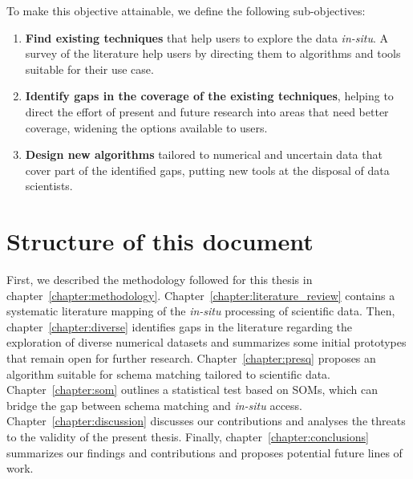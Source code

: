 To make this objective attainable, we define the following sub-objectives:

\begin{enumerate}
    \item \textbf{Find existing techniques} that help users
        to  explore the data \emph{in-situ}. A survey of the 
        literature help users by directing them to algorithms
        and tools suitable for their use case.
        
    \item \textbf{Identify gaps in the coverage of the existing
        techniques}, helping to direct the effort of present
        and future research into areas that need better
        coverage, widening the options available to users.

    \item \textbf{Design new algorithms} tailored to numerical 
    and uncertain data that cover part of the identified gaps,
    putting new tools at the disposal of data scientists.
\end{enumerate}
\label{enum:objectives}

\section{Structure of this document}

First, we described the methodology followed for this thesis in chapter~\ref{chapter:methodology}.
Chapter~\ref{chapter:literature_review} contains a systematic literature mapping
of the \emph{in-situ} processing of scientific data.
Then, chapter~\ref{chapter:diverse} identifies gaps in the literature regarding
the exploration of diverse numerical datasets and summarizes some initial prototypes
that remain open for further research.
Chapter~\ref{chapter:presq} proposes an algorithm suitable for schema matching
tailored to scientific data. Chapter~\ref{chapter:som} outlines a statistical
test based on \glspl{SOM}, which can bridge the gap between schema matching and
\emph{in-situ} access.
Chapter~\ref{chapter:discussion} discusses our contributions
and analyses the threats to the validity of the present thesis.
Finally, chapter~\ref{chapter:conclusions} summarizes our findings and contributions and proposes potential future lines of work.
